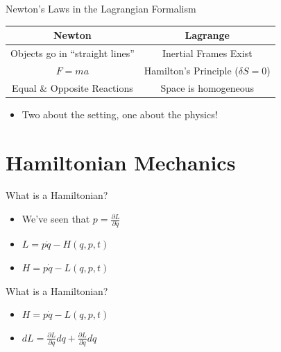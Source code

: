 \documentclass[10pt,xcolor={table,dvipsnames},t]{beamer}
\begin{document}
\begin{frame}{Newton's Laws in the Lagrangian Formalism}
\begin{center}
\begin{tabular}{|c|c|}
    \hline
    Newton & Lagrange  \\
    \hline 
    Objects go in ``straight lines'' & Inertial Frames Exist \\
    $F = ma$ & Hamilton's Principle ($\delta S = 0$) \\
    Equal \& Opposite Reactions & Space is homogeneous\\
    \hline
\end{tabular}
\end{center}
\begin{itemize}
    \item Two about the setting, one about the physics!
\end{itemize}
\end{frame}

\section{Hamiltonian Mechanics}

\begin{frame}{What is a Hamiltonian?}
    \begin{itemize}
        \item We've seen that $p = \frac{\partial L}{\partial \dot{q}}$
        \item $L = p \dot{q} - H(q,p,t)$
        \item $H = p \dot{q} - L(q,p,t)$
    \end{itemize}
    
\end{frame}

\begin{frame}{What is a Hamiltonian?}
    \begin{itemize}
        \item $H = p \dot{q} - L(q,p,t)$
        \item $dL = \frac{\partial L}{\partial q}d q + \frac{\partial L}{\partial \dot{q}}d \dot{q}$
        
        
    \end{itemize}
    
\end{frame}
\end{document}
